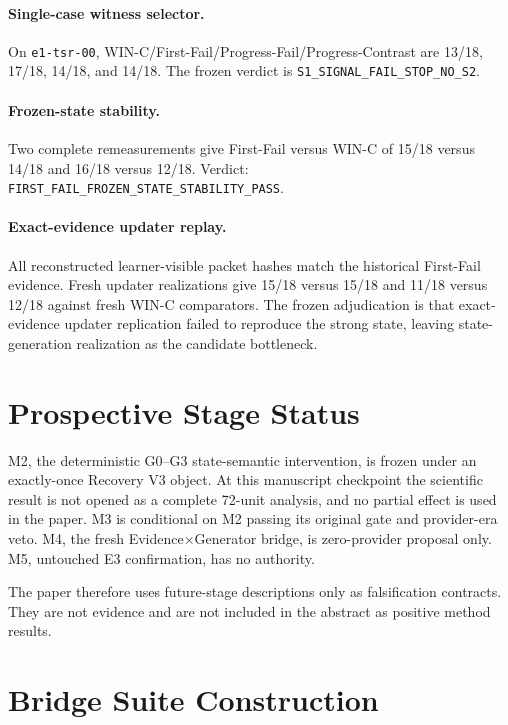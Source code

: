 \paragraph{Single-case witness selector.}
On \texttt{e1-tsr-00}, WIN-C/First-Fail/Progress-Fail/Progress-Contrast are 13/18, 17/18, 14/18, and 14/18. The frozen verdict is \texttt{S1\_SIGNAL\_FAIL\_STOP\_NO\_S2}.

\paragraph{Frozen-state stability.}
Two complete remeasurements give First-Fail versus WIN-C of 15/18 versus 14/18 and 16/18 versus 12/18. Verdict: \texttt{FIRST\_FAIL\_FROZEN\_STATE\_STABILITY\_PASS}.

\paragraph{Exact-evidence updater replay.}
All reconstructed learner-visible packet hashes match the historical First-Fail evidence. Fresh updater realizations give 15/18 versus 15/18 and 11/18 versus 12/18 against fresh WIN-C comparators. The frozen adjudication is that exact-evidence updater replication failed to reproduce the strong state, leaving state-generation realization as the candidate bottleneck.

\section{Prospective Stage Status}
\label{app:prospective}

M2, the deterministic G0--G3 state-semantic intervention, is frozen under an exactly-once Recovery V3 object. At this manuscript checkpoint the scientific result is not opened as a complete 72-unit analysis, and no partial effect is used in the paper. M3 is conditional on M2 passing its original gate and provider-era veto. M4, the fresh Evidence$\times$Generator bridge, is zero-provider proposal only. M5, untouched E3 confirmation, has no authority.

The paper therefore uses future-stage descriptions only as falsification contracts. They are not evidence and are not included in the abstract as positive method results.

\section{Bridge Suite Construction}
\label{app:suite}

